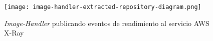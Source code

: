 \begin{landscape}
\begin{figure}[h]
  \vspace*{-3cm}  
  \centering
  \texttt{[image: image-handler-extracted-repository-diagram.png]}
  \caption{\emph{Image-Handler} publicando eventos de rendimiento al servicio AWS X-Ray}
  \label{fig:image-handler-pcm-model}
\end{figure}
\end{landscape}

%
%
%
%
%


